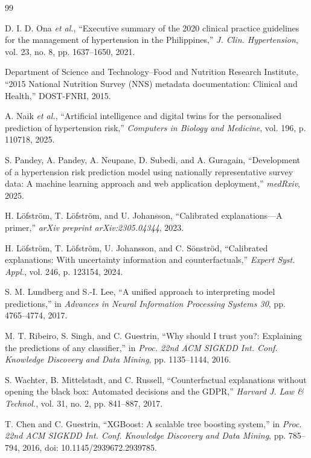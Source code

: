 \documentclass[journal]{IEEEtran}
\begin{document}
\begin{thebibliography}{99}

D. I. D. Ona \emph{et al.}, ``Executive summary of the 2020 clinical practice guidelines for the management of hypertension in the Philippines,'' \emph{J. Clin. Hypertension}, vol. 23, no. 8, pp. 1637--1650, 2021.

Department of Science and Technology--Food and Nutrition Research Institute, ``2015 National Nutrition Survey (NNS) metadata documentation: Clinical and Health,'' DOST-FNRI, 2015.

A. Naik \emph{et al.}, ``Artificial intelligence and digital twins for the personalised prediction of hypertension risk,'' \emph{Computers in Biology and Medicine}, vol. 196, p. 110718, 2025.

S. Pandey, A. Pandey, A. Neupane, D. Subedi, and A. Guragain, ``Development of a hypertension risk prediction model using nationally representative survey data: A machine learning approach and web application deployment,'' \emph{medRxiv}, 2025.

H. L\"ofstr\"om, T. L\"ofstr\"om, and U. Johansson, ``Calibrated explanations---A primer,'' \emph{arXiv preprint arXiv:2305.04344}, 2023.

H. L\"ofstr\"om, T. L\"ofstr\"om, U. Johansson, and C. S\"onstr\"od, ``Calibrated explanations: With uncertainty information and counterfactuals,'' \emph{Expert Syst. Appl.}, vol. 246, p. 123154, 2024.

S. M. Lundberg and S.-I. Lee, ``A unified approach to interpreting model predictions,'' in \emph{Advances in Neural Information Processing Systems 30}, pp. 4765--4774, 2017.

M. T. Ribeiro, S. Singh, and C. Guestrin, ``Why should I trust you?: Explaining the predictions of any classifier,'' in \emph{Proc. 22nd ACM SIGKDD Int. Conf. Knowledge Discovery and Data Mining}, pp. 1135--1144, 2016.

S. Wachter, B. Mittelstadt, and C. Russell, ``Counterfactual explanations without opening the black box: Automated decisions and the GDPR,'' \emph{Harvard J. Law \& Technol.}, vol. 31, no. 2, pp. 841--887, 2017.

T. Chen and C. Guestrin, ``XGBoost: A scalable tree boosting system,'' in \emph{Proc. 22nd ACM SIGKDD Int. Conf. Knowledge Discovery and Data Mining}, pp. 785--794, 2016, doi: 10.1145/2939672.2939785.


\end{thebibliography}
\end{document}

